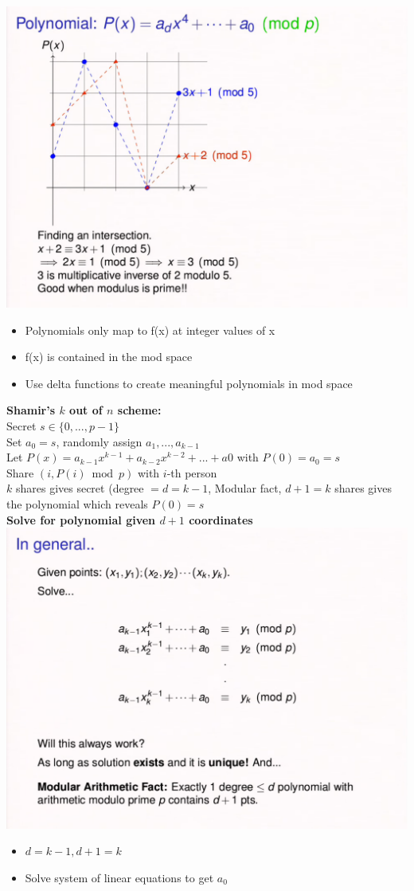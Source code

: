 \documentclass{article}\usepackage{amsmath,amssymb,amsthm,tikz,tkz-graph,color,chngpage,soul,hyperref,csquotes,graphicx,floatrow}\newcommand*{\QEDB}{\hfill\ensuremath{\square}}\newtheorem*{prop}{Proposition}\renewcommand{\theenumi}{\alph{enumi}}\usepackage[shortlabels]{enumitem}\usepackage[nobreak=true]{mdframed}\usetikzlibrary{matrix,calc}\MakeOuterQuote{"}\usepackage[margin=0.75in]{geometry} \newtheorem{theorem}{Theorem}
\begin{document}
\includegraphics{modpoly}\\
\begin{itemize}
\item Polynomials only map to f(x) at integer values of x
\item f(x) is contained in the mod space
\item Use delta functions to create meaningful polynomials in mod space
\end{itemize}
\textbf{Shamir's $k$ out of $n$ scheme:}\\
Secret $s \in \{0, ..., p-1\}$\\
Set $a_0 = s$, randomly assign $a_1, ..., a_{k-1}$\\
Let $P(x) = a_{k-1}x^{k-1} + a_{k-2}x^{k-2} + ... + a0$ with $P(0) = a_0 = s$\\
Share $(i, P(i) \bmod p)$ with $i$-th person\\
$k$ shares gives secret (degree $= d = k-1$, Modular fact, $d+1 = k$ shares gives the polynomial which reveals $P(0) = s$\\
\textbf{Solve for polynomial given $d+1$ coordinates}\\
\includegraphics{genpoly}
\begin{itemize}
\item $d = k-1, d+1 = k$
\item Solve system of linear equations to get $a_0$
\end{itemize}
\end{document}
